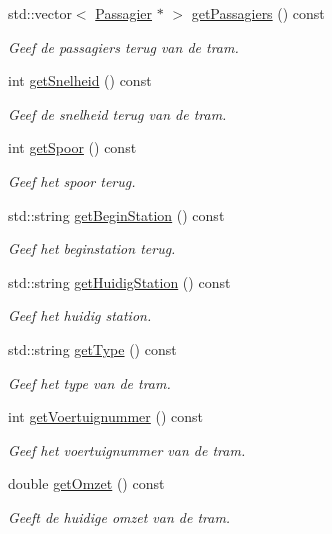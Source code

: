 \begin{DoxyCompactItemize}
std\+::vector$<$ \hyperlink{class_passagier}{Passagier} $\ast$ $>$ \hyperlink{class_tram_a767ed5eb3da3ee7c278988a8726125b3}{get\+Passagiers} () const 
\begin{DoxyCompactList}\small\item\em Geef de passagiers terug van de tram. \end{DoxyCompactList}\item 
int \hyperlink{class_tram_a40a12ae66cdc8965fc73d548dd038e4c}{get\+Snelheid} () const 
\begin{DoxyCompactList}\small\item\em Geef de snelheid terug van de tram. \end{DoxyCompactList}\item 
int \hyperlink{class_tram_a52655f991ffb58a8ab3557fd881a6f58}{get\+Spoor} () const 
\begin{DoxyCompactList}\small\item\em Geef het spoor terug. \end{DoxyCompactList}\item 
std\+::string \hyperlink{class_tram_aba7b84414cd60d013ac1db3f3403497d}{get\+Begin\+Station} () const 
\begin{DoxyCompactList}\small\item\em Geef het beginstation terug. \end{DoxyCompactList}\item 
std\+::string \hyperlink{class_tram_ae7bc337a42b2d839b4da5f648b781e79}{get\+Huidig\+Station} () const 
\begin{DoxyCompactList}\small\item\em Geef het huidig station. \end{DoxyCompactList}\item 
std\+::string \hyperlink{class_tram_a936e961a1b5d7c1c91bea42abe3658b8}{get\+Type} () const 
\begin{DoxyCompactList}\small\item\em Geef het type van de tram. \end{DoxyCompactList}\item 
int \hyperlink{class_tram_a1ba836064d24b2521fe1ad37b5f78422}{get\+Voertuignummer} () const 
\begin{DoxyCompactList}\small\item\em Geef het voertuignummer van de tram. \end{DoxyCompactList}\item 
double \hyperlink{class_tram_a4c621616fff1b04ef360365239198b1a}{get\+Omzet} () const 
\begin{DoxyCompactList}\small\item\em Geeft de huidige omzet van de tram. \end{DoxyCompactList}\item 

\end{DoxyCompactItemize}
